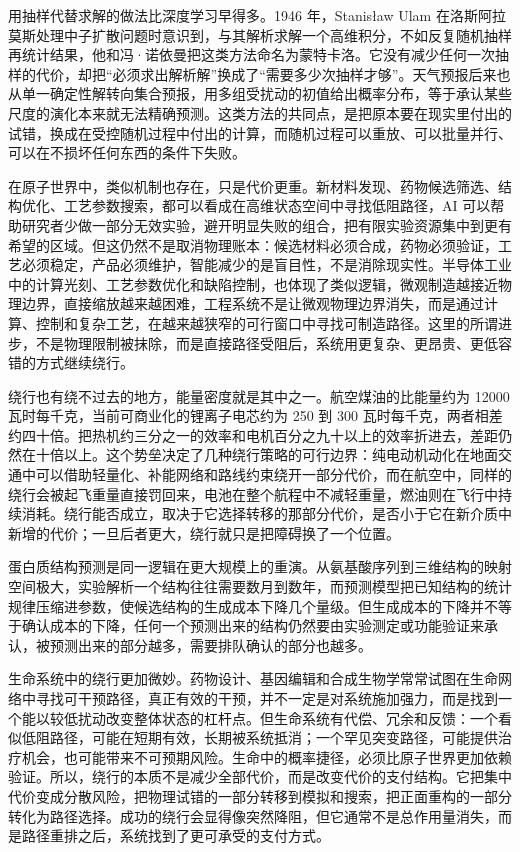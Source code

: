 用抽样代替求解的做法比深度学习早得多。1946 年，Stanis{\l}aw Ulam 在洛斯阿拉莫斯处理中子扩散问题时意识到，与其解析求解一个高维积分，不如反复随机抽样再统计结果，他和冯·诺依曼把这类方法命名为蒙特卡洛。它没有减少任何一次抽样的代价，却把“必须求出解析解”换成了“需要多少次抽样才够”。天气预报后来也从单一确定性解转向集合预报，用多组受扰动的初值给出概率分布，等于承认某些尺度的演化本来就无法精确预测。这类方法的共同点，是把原本要在现实里付出的试错，换成在受控随机过程中付出的计算，而随机过程可以重放、可以批量并行、可以在不损坏任何东西的条件下失败。

在原子世界中，类似机制也存在，只是代价更重。新材料发现、药物候选筛选、结构优化、工艺参数搜索，都可以看成在高维状态空间中寻找低阻路径，AI 可以帮助研究者少做一部分无效实验，避开明显失败的组合，把有限实验资源集中到更有希望的区域。但这仍然不是取消物理账本：候选材料必须合成，药物必须验证，工艺必须稳定，产品必须维护，智能减少的是盲目性，不是消除现实性。半导体工业中的计算光刻、工艺参数优化和缺陷控制，也体现了类似逻辑，微观制造越接近物理边界，直接缩放越来越困难，工程系统不是让微观物理边界消失，而是通过计算、控制和复杂工艺，在越来越狭窄的可行窗口中寻找可制造路径。这里的所谓进步，不是物理限制被抹除，而是直接路径受阻后，系统用更复杂、更昂贵、更低容错的方式继续绕行。

绕行也有绕不过去的地方，能量密度就是其中之一。航空煤油的比能量约为 12000 瓦时每千克，当前可商业化的锂离子电芯约为 250 到 300 瓦时每千克，两者相差约四十倍。把热机约三分之一的效率和电机百分之九十以上的效率折进去，差距仍然在十倍以上。这个势垒决定了几种绕行策略的可行边界：纯电动机动化在地面交通中可以借助轻量化、补能网络和路线约束绕开一部分代价，而在航空中，同样的绕行会被起飞重量直接罚回来，电池在整个航程中不减轻重量，燃油则在飞行中持续消耗。绕行能否成立，取决于它选择转移的那部分代价，是否小于它在新介质中新增的代价；一旦后者更大，绕行就只是把障碍换了一个位置。

蛋白质结构预测是同一逻辑在更大规模上的重演。从氨基酸序列到三维结构的映射空间极大，实验解析一个结构往往需要数月到数年，而预测模型把已知结构的统计规律压缩进参数，使候选结构的生成成本下降几个量级。但生成成本的下降并不等于确认成本的下降，任何一个预测出来的结构仍然要由实验测定或功能验证来承认，被预测出来的部分越多，需要排队确认的部分也越多。

生命系统中的绕行更加微妙。药物设计、基因编辑和合成生物学常常试图在生命网络中寻找可干预路径，真正有效的干预，并不一定是对系统施加强力，而是找到一个能以较低扰动改变整体状态的杠杆点。但生命系统有代偿、冗余和反馈：一个看似低阻路径，可能在短期有效，长期被系统抵消；一个罕见突变路径，可能提供治疗机会，也可能带来不可预期风险。生命中的概率捷径，必须比原子世界更加依赖验证。所以，绕行的本质不是减少全部代价，而是改变代价的支付结构。它把集中代价变成分散风险，把物理试错的一部分转移到模拟和搜索，把正面重构的一部分转化为路径选择。成功的绕行会显得像突然降阻，但它通常不是总作用量消失，而是路径重排之后，系统找到了更可承受的支付方式。


